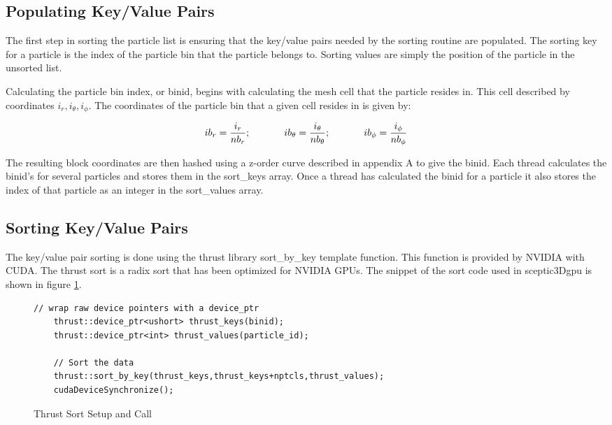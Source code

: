 		\subsection{Populating Key/Value Pairs}
The first step in sorting the particle list is ensuring that the key/value pairs needed by the sorting routine are populated. The sorting key for a particle is the index of the particle bin that the particle belongs to. Sorting values are simply the position of the particle in the unsorted list. 

Calculating the particle bin index, or binid, begins with calculating the mesh cell that the particle resides in. This cell described by coordinates $i_r, i_{\theta}, i_{\phi}$. The coordinates of the particle bin that a given cell resides in is given by:

\begin{equation}
ib_r = \frac{i_r}{nb_r} \mathrm{;}\hspace{0.5in} ib_{\theta} = \frac{i_{\theta}}{nb_{\theta}} \mathrm{;} \hspace{0.5in} ib_{\phi} = \frac{i_{\phi}}{nb_{\phi}}
\end{equation}

	The resulting block coordinates are then hashed using a z-order curve described in appendix A to give the binid. Each thread calculates the binid's for several particles and stores them in the sort\_keys array. Once a thread has calculated the binid for a particle it also stores the index of that particle as an integer in the sort\_values array. 

		\subsection{Sorting Key/Value Pairs}
		The key/value pair sorting is done using the thrust library sort\_by\_key template function. This function is provided by NVIDIA with CUDA. The thrust sort is a radix sort that has been optimized for NVIDIA GPUs\cite{NVIDIACorporation2011a}. The snippet of the sort code used in sceptic3Dgpu is shown in figure \ref{fig:thrust_sort}.

\begin{figure}
\begin{lstlisting}[frame=single]
	// wrap raw device pointers with a device_ptr
	thrust::device_ptr<ushort> thrust_keys(binid);
	thrust::device_ptr<int> thrust_values(particle_id);

	// Sort the data
	thrust::sort_by_key(thrust_keys,thrust_keys+nptcls,thrust_values);
	cudaDeviceSynchronize();
\end{lstlisting}
\vspace{-0.4in}
\caption{Thrust Sort Setup and Call}
\label{fig:thrust_sort}
\end{figure}


